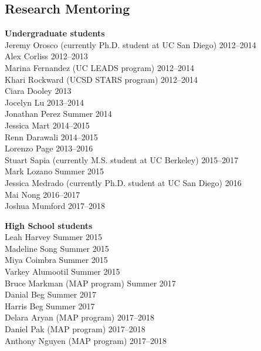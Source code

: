 \documentclass[]{res}
\begin{document}
\begin{resume}
\section{Research Mentoring}
\vspace{0.1in}

\textbf{Undergraduate students} \\
Jeremy Orosco (currently Ph.D. student at UC San Diego) \hfill 2012--2014 \\
Alex Corliss \hfill 2012--2013 \\
Marina Fernandez (UC LEADS program) \hfill 2012--2014 \\
Khari Rockward (UCSD STARS program) \hfill 2012--2014 \\
Ciara Dooley \hfill 2013 \\
Jocelyn Lu \hfill 2013--2014 \\
Jonathan Perez \hfill Summer 2014 \\
Jessica Mart \hfill 2014--2015 \\
Renn Darawali \hfill 2014--2015 \\
Lorenzo Page \hfill 2013--2016 \\
Stuart Sapia (currently M.S. student at UC Berkeley) \hfill 2015--2017 \\
Mark Lozano \hfill Summer 2015 \\
Jessica Medrado (currently Ph.D. student at UC San Diego) \hfill 2016 \\
Mai Nong \hfill 2016--2017 \\
Joshua Mumford \hfill 2017--2018


\textbf{High School students} \\
Leah Harvey \hfill Summer 2015 \\
Madeline Song \hfill Summer 2015 \\
Miya Coimbra \hfill Summer 2015 \\
Varkey Alumootil \hfill Summer 2015 \\
Bruce Markman (MAP program) \hfill Summer 2017 \\
Danial Beg \hfill Summer 2017 \\
Harris Beg \hfill Summer 2017 \\
Delara Aryan (MAP program) \hfill 2017--2018 \\
Daniel Pak (MAP program) \hfill 2017--2018 \\
Anthony Nguyen (MAP program) \hfill 2017--2018




\end{resume}
\end{document}
